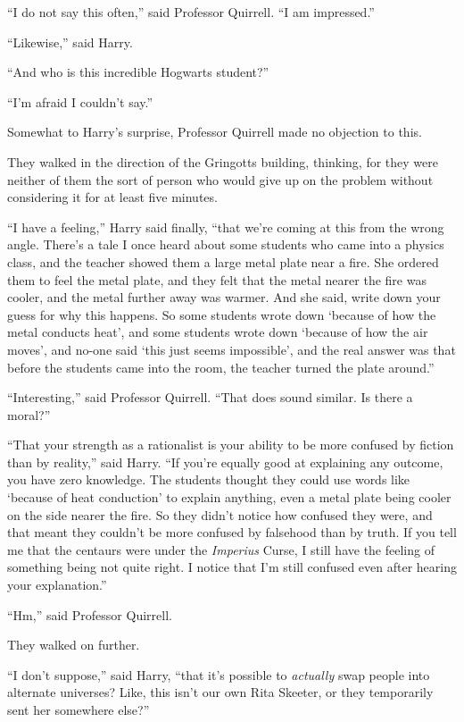 “I do not say this often,” said Professor Quirrell.
“I am impressed.”

“Likewise,” said Harry.

“And who is this incredible Hogwarts student?”

“I’m afraid I couldn’t say.”

Somewhat to Harry’s surprise, Professor Quirrell made no objection to this.

They walked in the direction of the Gringotts building, thinking, for they were neither of them the sort of person who would give up on the problem without considering it for at least five minutes.

“I have a feeling,” Harry said finally, “that we’re coming at this from the wrong angle. There’s a tale I once heard about some students who came into a physics class, and the teacher showed them a large metal plate near a fire. She ordered them to feel the metal plate, and they felt that the metal nearer the fire was cooler, and the metal further away was warmer. And she said, write down your guess for why this happens. So some students wrote down ‘because of how the metal conducts heat’, and some students wrote down ‘because of how the air moves’, and no-one said ‘this just seems impossible’, and the real answer was that before the students came into the room, the teacher turned the plate around.”

“Interesting,” said Professor Quirrell.
“That does sound similar. Is there a moral?”

“That your strength as a rationalist is your ability to be more confused by fiction than by reality,” said Harry.
“If you’re equally good at explaining any outcome, you have zero knowledge. The students thought they could use words like ‘because of heat conduction’ to explain anything, even a metal plate being cooler on the side nearer the fire. So they didn’t notice how confused they were, and that meant they couldn’t be more confused by falsehood than by truth. If you tell me that the centaurs were under the \emph{Imperius} Curse, I still have the feeling of something being not quite right. I notice that I’m still confused even after hearing your explanation.”

“Hm,” said Professor Quirrell.

They walked on further.

“I don’t suppose,” said Harry, “that it’s possible to \emph{actually} swap people into alternate universes? Like, this isn’t our own Rita Skeeter, or they temporarily sent her somewhere else?”

